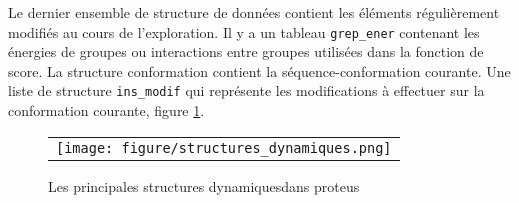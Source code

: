 Le dernier ensemble de structure de données contient les éléments régulièrement modifiés au cours de l'exploration.
Il y a un tableau  \verb!grep_ener! contenant les énergies de groupes ou interactions entre groupes utilisées dans la fonction de score. La structure conformation contient la séquence-conformation courante. Une liste de structure \verb!ins_modif! qui représente les modifications à effectuer sur la conformation courante, figure \ref{fig:structDyna}.  

   \begin{figure}[!htbp]
     \centering
     \begin{tabular}{c}
       \texttt{[image: figure/structures\_dynamiques.png]} 
     \end{tabular}
     
     \caption{Les principales structures \og dynamiques\fg dans proteus}
\label{fig:structDyna}
   \end{figure}




